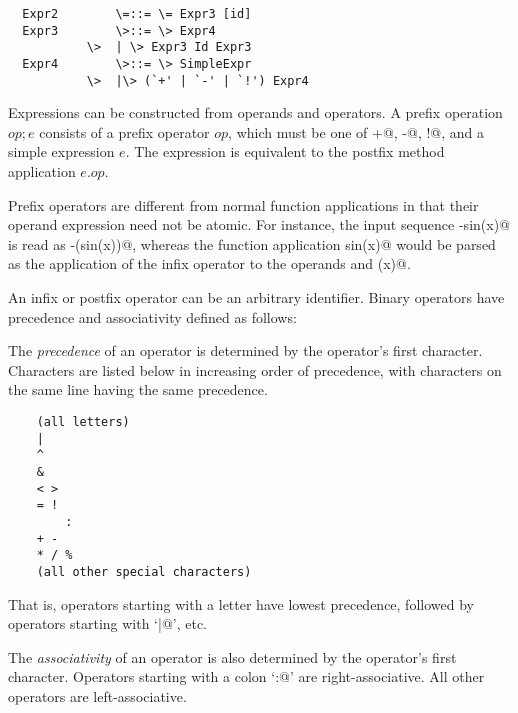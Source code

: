 \documentclass[11pt]{report}
\begin{document}
\begin{itemize}
\syntax\begin{verbatim}
  Expr2        \=::= \= Expr3 [id]
  Expr3        \>::= \> Expr4
	       \>  | \> Expr3 Id Expr3
  Expr4        \>::= \> SimpleExpr
	       \>  |\> (`+' | `-' | `!') Expr4
\end{verbatim}

Expressions can be constructed from operands and operators.  A prefix
operation $op;e$ consists of a prefix operator $op$, which must be one
of \verb@+@, \verb@-@, \verb@!@, and a simple expression $e$.  The
expression is equivalent to the postfix method application $e.op$.

Prefix operators are different from normal function applications in
that their operand expression need not be atomic. For instance, the
input sequence \verb@-sin(x)@ is read as \verb@-(sin(x))@, whereas the
function application \verb@negate sin(x)@ would be parsed as the
application of the infix operator \verb@sin@ to the operands
\verb@negate@ and \verb@(x)@.

An infix or postfix operator can be an arbitrary identifier. Binary
operators have precedence and associativity defined as follows:

The {\em precedence} of an operator is determined by the operator's first
character. Characters are listed below in increasing order of
precedence, with characters on the same line having the same precedence.
\begin{verbatim}
	(all letters)
	|
	^
	&
	< >
	= !
        :
	+ -
	* / %
	(all other special characters)
\end{verbatim}
That is, operators starting with a letter have lowest precedence,
followed by operators starting with `\verb@|@', etc.

The {\em associativity} of an operator
is also determined by the operator's first character.
 Operators starting with a colon
`\verb@:@' are right-associative. All other operators are left-associative.


\end{itemize}
\end{document}
